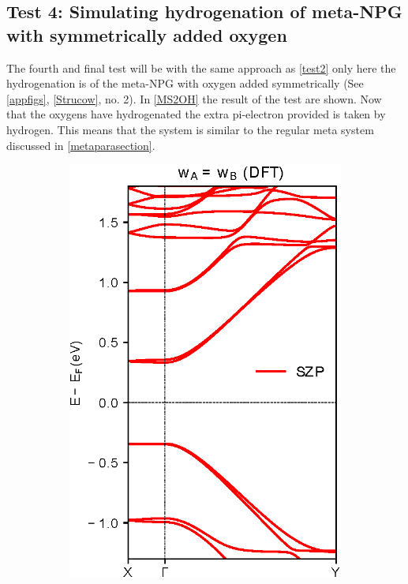 \subsection{Test 4: Simulating hydrogenation of meta-NPG with symmetrically added oxygen}\label{test4}
The fourth and final test will be with the same approach as \cref{test2} only here the hydrogenation is of the meta-NPG with oxygen added symmetrically (See \cref{appfigs}, \cref{Strucow}, no. 2). In \cref{MS2OH} the result of the test are shown. Now that the oxygens have hydrogenated the extra pi-electron provided is taken by hydrogen. This means that the system is similar to the regular meta system discussed in \cref{metaparasection}.
\begin{figure}[h]
	\centering
	\begin{subfigure}[b]{0.3\textwidth}
		\centering
		\includegraphics[width=\textwidth]{Figures/MS2OHDFT.eps}

\end{subfigure}
\end{figure}
